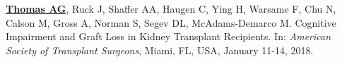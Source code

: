 \documentclass[10pt]{article}
\makeatletter
\newlength{\bibhang}
\newlength{\bibsep}
 {\@listi \global\bibsep\itemsep \global\advance\bibsep by\parsep}
\newenvironment{bibenum*}
  {\renewcommand\labelenumi{[\theenumi]}%
   \etaremune[
     topsep=0pt,
     itemsep=\bibsep,
     parsep=0pt,partopsep=0pt,
     itemindent=-\bibhang,
     leftmargin={\bibhang+\widthof{[999]}}]}
  {\endetaremune}
\makeatother
\begin{document}
\begin{bibenum*}





\item \underline{\textbf{Thomas AG}}, Ruck J, Shaffer AA, Haugen C,
  Ying H, Warsame F, Chu N, Calson M, Gross A, Norman S, Segev DL,
  McAdams-Demarco M. Cognitive Impairment and Graft Loss in
  Kidney Transplant Recipients.
  In: \emph{American Society of Transplant Surgeons},
  Miami, FL, USA, January 11-14, 2018.



\end{bibenum*}
\end{document}
